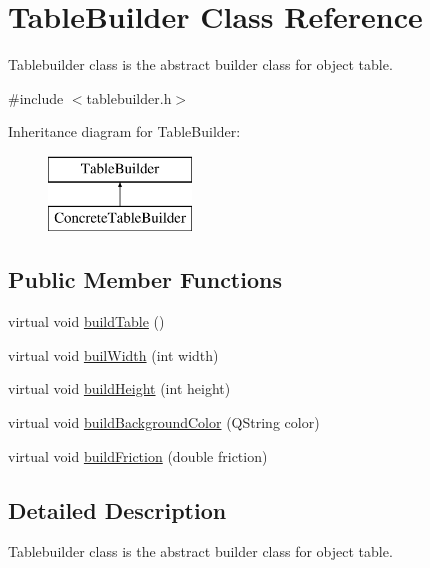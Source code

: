 \hypertarget{class_table_builder}{}\section{Table\+Builder Class Reference}
\label{class_table_builder}


Tablebuilder class is the abstract builder class for object table.  




{\ttfamily \#include $<$tablebuilder.\+h$>$}

Inheritance diagram for Table\+Builder\+:\begin{figure}[H]
\begin{center}
\leavevmode
\includegraphics[height=2.000000cm]{class_table_builder}
\end{center}
\end{figure}
\subsection*{Public Member Functions}
\begin{DoxyCompactItemize}
\item 
virtual void \mbox{\hyperlink{class_table_builder_a4aba0952fb1912f9ff7ca4cfb3085dd9}{build\+Table}} ()
\item 
virtual void \mbox{\hyperlink{class_table_builder_a4269a0b8c10cf6fcae0c8525bdb08ff0}{buil\+Width}} (int width)
\item 
virtual void \mbox{\hyperlink{class_table_builder_ad3e3bb11cd8f9eecd49ad6012e358d05}{build\+Height}} (int height)
\item 
virtual void \mbox{\hyperlink{class_table_builder_a43bfcc7fbc5c45c0e2fe579b7d7e5f9c}{build\+Background\+Color}} (Q\+String color)
\item 
virtual void \mbox{\hyperlink{class_table_builder_a02a8d4ae71a3ef43ffd283ac10aa2e19}{build\+Friction}} (double friction)
\end{DoxyCompactItemize}


\subsection{Detailed Description}
Tablebuilder class is the abstract builder class for object table. 

